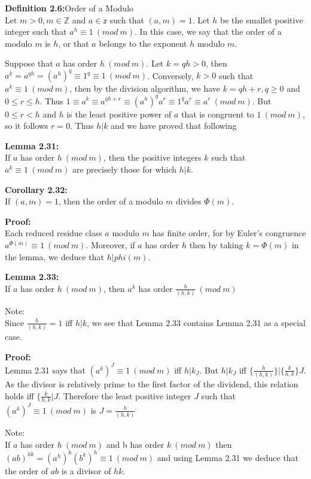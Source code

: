\documentclass[a4paper]{article}
\begin{document}
\textbf{Definition 2.6:}Order of a Modulo\\
Let $m>0, m\in\mathbb{Z}$ and $a\in\mathbb{z}$ such that $(a,m)=1$. Let $h$ be the smallet positive integer such that $a^h\equiv 1\ (mod\ m)$. In this case, we say that the order of a modulo $m$ is $h$, or that $a$ belongs to the exponent $h$ modulo $m$.

Suppose that $a$ has order $h\ (mod\ m)$. Let $k=qh>0$, then $a^k=a^{qh}=(a^h)^q\equiv 1^q\equiv 1\ (mod\ m)$.
Conversely, $k>0$ such that $a^k\equiv 1\ (mod\ m)$, then by the division algorithm, we have $k=qh+r, q\geq0$ and $0\leq r\leq h$. Thus $1\equiv a^k\equiv a^{qh+r}\equiv (a^h)^qa^r\equiv 1^qa^r\equiv a^r\ (mod\ m)$. But $0\leq r<h$ and $h$ is the least positive power of $a$ that is congruent to $1\ (mod\ m)$, so it follows $r=0$. Thus $h|k$ and we have proved that following

\textbf{Lemma 2.31:}\\
If $a$ has order $h\ (mod\ m)$, then the positive integers $k$ such that $a^k\equiv 1\ (mod\ m)$ are precisely those for which $h|k$.

\textbf{Corollary 2.32:}\\
If $(a,m)=1$, then the order of a modulo $m$ divides $\Phi(m)$.

\textbf{Proof:}\\
Each reduced residue class $a$ modulo $m$ has finite order, for by Euler's congruence $a^{\Phi(m)}\equiv 1\ (mod\ m)$. Moreover, if $a$ has order $h$ then by taking $k=\Phi(m)$ in the lemma, we deduce that $h|phi(m)$.

\textbf{Lemma 2.33:}\\
If $a$ has order $h\ (mod\ m)$, then $a^k$ has order $\frac{h}{(h,k)}\ (mod\ m)$

Note:\\
Since $\frac{h}{(h,k)}=1$ iff $h|k$, we see that Lemma 2.33 contains Lemma 2.31 as a special case.

\textbf{Proof:}\\
Lemma 2.31 says that $(a^k)^J\equiv 1\ (mod\ m)$ iff $h|k_J$. But $h|k_J$ iff $\{\frac{h}{(h,k)}\}|\{\frac{k}{h,k}\}J$. As the divisor is relatively prime to the first factor of the dividend, this relation holds iff $\{\frac{k}{h,k}|J$. Therefore the least positive integer $J$ such that $(a^k)^J\equiv 1\ (mod\ m)$ is $J=\frac{h}{(h,k)}$

Note:\\
If $a$ has order $h\ (mod\ m)$ and b has order $k\ (mod\ m)$ then $(ab)^{hk}=(a^h)^k(b^k)^h\equiv 1\ (mod\ m)$ and using Lemma 2.31 we deduce that the order of $ab$ is a divisor of $hk$.
\end{document}
